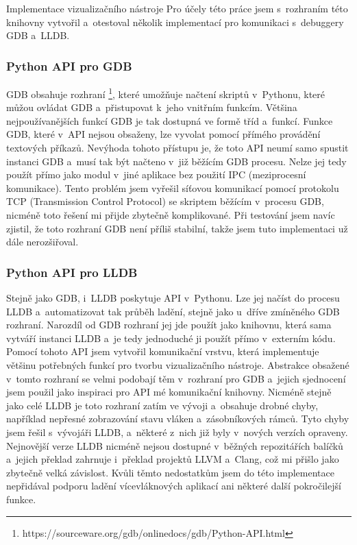 \documentclass[czech,bachelor,male,python,dept460,hidelinks]{diploma}						%
\begin{document}
\begin{section}{Implementace vizualizačního nástroje}
		Pro účely této práce jsem s~rozhraním této knihovny vytvořil a~otestoval několik implementací pro komunikaci s~debuggery GDB a~LLDB.

		\subsubsection{Python API pro GDB}
		\label{ref:GdbPythonApi}
		GDB obsahuje rozhraní \footnote{https://sourceware.org/gdb/onlinedocs/gdb/Python-API.html}, které umožňuje načtení skriptů v~Pythonu, které
		můžou ovládat GDB a~přistupovat k~jeho vnitřním funkcím. Většina nejpoužívanějších funkcí GDB je tak dostupná ve formě tříd a~funkcí.
		Funkce GDB, které v~API nejsou obsaženy, lze vyvolat pomocí přímého provádění textových příkazů.
		Nevýhoda tohoto přístupu je, že toto API neumí samo spustit instanci GDB a~musí tak být načteno v~již běžícím GDB procesu.
		Nelze jej tedy použít přímo jako modul v~jiné aplikace bez použití IPC (meziprocesní komunikace).
		Tento problém jsem vyřešil síťovou komunikací pomocí protokolu TCP (Transmission Control Protocol) se skriptem běžícím v~procesu GDB, nicméně
		toto řešení mi přijde zbytečně komplikované. Při testování jsem navíc zjistil, že toto rozhraní GDB není příliš stabilní, takže jsem tuto implementaci
		už dále nerozšiřoval.
		
		\subsubsection{Python API pro LLDB}
		Stejně jako GDB, i~LLDB poskytuje API v~Pythonu. Lze jej načíst do procesu LLDB a~automatizovat tak průběh ladění, stejně jako u~dříve zmíněného GDB
		rozhraní. Narozdíl od GDB rozhraní jej jde použít jako knihovnu, která sama vytváří instanci LLDB a~je tedy jednoduché ji použít přímo v~externím kódu.
		Pomocí tohoto API jsem vytvořil komunikační vrstvu, která implementuje většinu potřebných funkcí pro tvorbu vizualizačního nástroje.
		Abstrakce obsažené v~tomto rozhraní se velmi podobají těm v~rozhraní pro GDB a~jejich sjednocení jsem použil jako inspiraci pro API mé komunikační knihovny.
		Nicméně stejně jako celé LLDB je toto rozhraní zatím ve vývoji a~obsahuje drobné chyby, například nepřesné zobrazování stavu vláken a~zásobníkových rámců.
		Tyto chyby jsem řešil s~vývojáři LLDB, a~některé z~nich již byly v~nových verzích opraveny. Nejnovější verze LLDB nicméně nejsou dostupné v~běžných
		repozitářích balíčků a~jejich překlad zahrnuje i~překlad projektů LLVM a~Clang, což mi přišlo jako zbytečně velká závislost.
		Kvůli těmto nedostatkům jsem do této implementace nepřidával podporu ladění vícevláknových aplikací ani některé další pokročilejší funkce.
		

\end{section}
\end{document}
